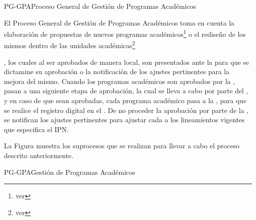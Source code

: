 


\begin{procesoGeneral}{PG-GPA}{Proceso General de Gestión de Programas Académicos} {
		
	    El Proceso General de Gestión de Programas Académicos toma en cuenta la elaboración de propuestas de nuevos programas académicos\footnote{ver } o el rediseño de los mismos dentro de las unidades académicas\footnote{ver }}, los cuales al ser aprobados de manera local, son presentados ante la para que se dictamine su aprobación o la notificación de los ajustes pertinentes para la mejora del mismo. Cuando los programas académicos son aprobados por la , pasan a una siguiente etapa de aprobación, la cual se lleva a cabo por parte del , y en caso de que sean aprobadas, cada programa académico pasa a la , para que se realice el registro digital en el . De no proceder la aprobación por parte de la , se notifican los ajustes pertinentes para ajustar cada  a los lineamientos vigentes que especifica el IPN.

		\noindent La Figura  muestra los suprocesos que se realizan para llevar a cabo el proceso descrito anteriormente.
		
	{PG-GPA}{Gestión de Programas Académicos}

\end{procesoGeneral}

